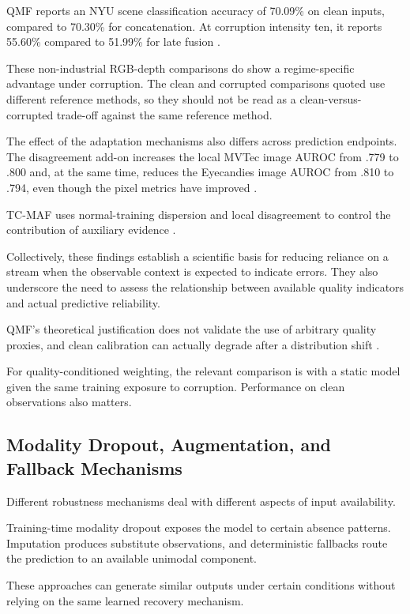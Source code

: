 QMF reports an NYU scene classification accuracy of 70.09\% on clean inputs, compared to 70.30\% for
concatenation. At corruption intensity ten, it reports 55.60\% compared to 51.99\% for late fusion
\parencite[Table~1]{zhang_provable_2023}.

These non-industrial RGB-depth comparisons do show a regime-specific advantage under corruption. The
clean and corrupted comparisons quoted use different reference methods, so they should not be read
as a clean-versus-corrupted trade-off against the same reference method.

The effect of the adaptation mechanisms also differs across prediction endpoints. The disagreement
add-on increases the local MVTec image AUROC from .779 to .800 and, at the same time, reduces the
Eyecandies image AUROC from .810 to .794, even though the pixel metrics have improved \parencite[Tables~4--5]{xu_cross-modal_2026}.

TC-MAF uses normal-training dispersion and local disagreement to control the contribution of
auxiliary evidence \parencite{deng_tc-maf_2026}.

Collectively, these findings establish a scientific basis for reducing reliance on a stream when the
observable context is expected to indicate errors. They also underscore the need to assess the
relationship between available quality indicators and actual predictive reliability.

QMF's theoretical justification does not validate the use of arbitrary quality proxies, and clean
calibration can actually degrade after a distribution shift \parencite{zhang_provable_2023,ovadia_can_2019}.

For quality-conditioned weighting, the relevant comparison is with a static model given the same training exposure to corruption. Performance on clean observations also matters.

\subsection{Modality Dropout, Augmentation, and Fallback Mechanisms}

Different robustness mechanisms deal with different aspects of input availability.

Training-time modality dropout exposes the model to certain absence patterns. Imputation produces
substitute observations, and deterministic fallbacks route the prediction to an available unimodal
component.

These approaches can generate similar outputs under certain conditions without relying on the same
learned recovery mechanism.

